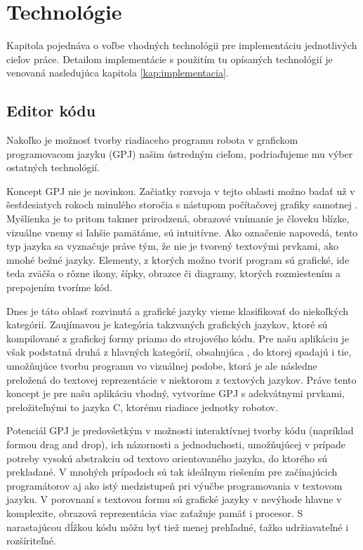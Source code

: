 \chapter{Technológie}
\label{kap:technologie}

Kapitola pojednáva o voľbe vhodných technológii pre implementáciu jednotlivých cieľov práce. Detailom implementácie s použitím tu opísaných technológií je venovaná nasledujúca kapitola \ref{kap:implementacia}.

\section{Editor kódu}
\label{kap:GrafickyProgramovaciJayzk}
Nakoľko je možnosť tvorby riadiaceho programu robota v grafickom programovacom jazyku (GPJ) našim ústredným cieľom, podriaďujeme mu výber ostatných technológií.

Koncept GPJ nie je novinkou. Začiatky rozvoja v tejto oblasti možno badať už v šesťdesiatych rokoch minulého storočia s nástupom počítačovej grafiky samotnej \cite{boshernitsan2004visual}. Myšlienka je to pritom takmer prirodzená, obrazové vnímanie je človeku blízke, vizuálne vnemy si ľahšie pamätáme, sú intuitívne. Ako označenie napovedá, tento typ jazyka sa vyznačuje práve tým, že nie je tvorený textovými prvkami, ako mnohé bežné jazyky. Elementy, z ktorých možno tvoriť program sú grafické, ide teda zväčša o rôzne ikony, šípky, obrazce či diagramy, ktorých rozmiestením a prepojením tvoríme kód.

Dnes je táto oblasť rozvinutá a grafické jazyky vieme klasifikovať do niekoľkých kategórií. Zaujímavou je kategória takzvaných  grafických jazykov, ktoré sú kompilované z grafickej formy priamo do strojového kódu. Pre našu aplikáciu je však podstatná druhá z hlavných kategórií, obsahujúca , do ktorej spadajú i tie, umožňujúce tvorbu programu vo vizuálnej podobe, ktorá je ale následne preložená do textovej reprezentácie v niektorom z textových jazykov. Práve tento koncept je pre našu aplikáciu vhodný, vytvoríme GPJ s adekvátnymi prvkami, preložiteľnými to jazyka C, ktorému  riadiace jednotky robotov.

Potenciál GPJ je predovšetkým v možnosti interaktívnej tvorby kódu (napríklad formou drag and drop), ich názornosti a jednoduchosti, umožňujúcej v prípade potreby vysokú abstrakciu od textovo orientovaného jazyka, do ktorého sú prekladané. V mnohých prípadoch sú tak ideálnym riešením pre začínajúcich programátorov aj ako istý medzistupeň pri výučbe programovania v textovom jazyku. V porovnaní s textovou formu sú grafické jazyky v nevýhode hlavne v komplexite, obrazová reprezentácia viac zaťažuje pamäť i procesor. S narastajúcou dĺžkou kódu môžu byť tiež menej prehľadné, ťažko udržiavateľné i rozšíriteľné.

